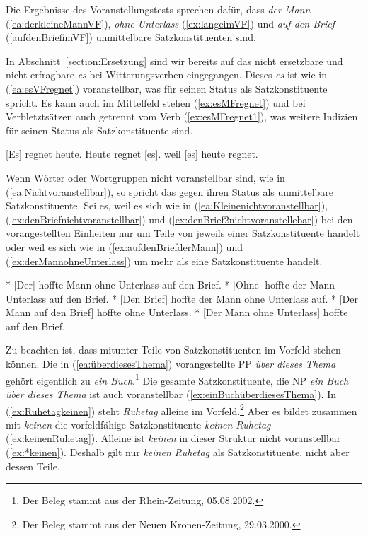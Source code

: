 Die Ergebnisse des Voranstellungstests sprechen dafür, dass \textit{der Mann} (\ref{ea:derkleineMannVF}), \textit{ohne Unterlass} (\ref{ex:langeimVF}) und \textit{auf den Brief} (\ref{aufdenBriefimVF}) unmittelbare Satzkonstituenten sind.

In Abschnitt~\ref{section:Ersetzung} sind wir bereits auf das nicht ersetzbare und nicht erfragbare \textit{es} bei Witterungsverben eingegangen. Dieses \textit{es} ist wie in (\ref{ea:esVFregnet}) voranstellbar, was für seinen Status als Satzkonstituente spricht. Es kann auch im Mittelfeld stehen (\ref{ex:esMFregnet}) und bei Verbletztsätzen auch getrennt vom Verb (\ref{ex:esMFregnet1}), was weitere Indizien für seinen Status als Satzkonstituente sind.

\ea 
\ea \label{ea:esVFregnet} [Es] regnet heute. 
\ex \label{ex:esMFregnet} Heute regnet [es].
\ex \label{ex:esMFregnet1} weil [es] heute regnet.
\z 
\z 


Wenn Wörter oder Wortgruppen nicht voranstellbar sind, wie in (\ref{ea:Nichtvoranstellbar}), so spricht das gegen ihren Status als unmittelbare Satzkonstituente. Sei es, weil es sich wie in (\ref{ea:Kleinenichtvoranstellbar}), (\ref{ex:denBriefnichtvoranstellbar}) und (\ref{ex:denBrief2nichtvoranstellebar}) bei den vorangestellten Einheiten nur um Teile von jeweils einer Satzkonstituente handelt oder weil es sich wie in (\ref{ex:aufdenBriefderMann}) und (\ref{ex:derMannohneUnterlass}) um mehr als eine Satzkonstituente handelt. 

\ea \label{ea:Nichtvoranstellbar}
\ea \label{ea:Kleinenichtvoranstellbar} * [Der] hoffte Mann ohne Unterlass auf den Brief.
\ex \label{ex:denBriefnichtvoranstellbar} * [Ohne] hoffte der Mann Unterlass auf den Brief.
\ex \label{ex:denBrief2nichtvoranstellebar} * [Den Brief] hoffte der Mann ohne Unterlass auf.
\ex \label{ex:aufdenBriefderMann} * [Der Mann auf den Brief] hoffte ohne Unterlass.
\ex \label{ex:derMannohneUnterlass} * [Der Mann ohne Unterlass] hoffte auf den Brief.
\z 
\z 

Zu beachten ist, dass mitunter Teile von Satzkonstituenten im Vorfeld stehen können. Die in (\ref{ea:überdiesesThema}) vorangestellte PP \textit{über dieses Thema} gehört eigentlich zu \textit{ein Buch}.\footnote{Der Beleg stammt aus der Rhein-Zeitung, 05.08.2002.} Die gesamte Satzkonstituente, die NP \textit{ein Buch über dieses Thema} ist auch voranstellbar (\ref{ex:einBuchüberdiesesThema}). In (\ref{ex:Ruhetagkeinen}) steht \textit{Ruhetag} alleine im Vorfeld.\footnote{Der Beleg stammt aus der Neuen Kronen-Zeitung, 29.03.2000.} Aber es bildet zusammen mit \textit{keinen} die vorfeldfähige Satzkonstituente \textit{keinen Ruhetag} (\ref{ex:keinenRuhetag}). Alleine ist \textit{keinen} in dieser Struktur nicht voranstellbar (\ref{ex:*keinen}). Deshalb gilt nur \textit{keinen Ruhetag} als Satzkonstituente, nicht aber dessen Teile.


